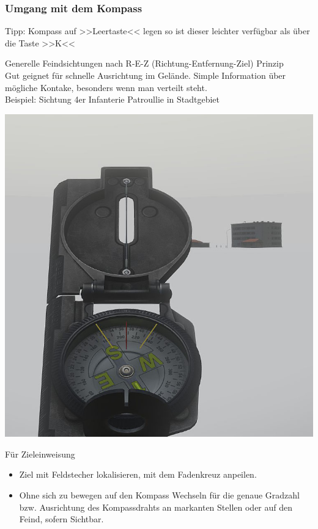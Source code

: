 \subsubsection{Umgang mit dem Kompass}

	Tipp: Kompass auf >>Leertaste<< legen so ist dieser leichter verfügbar als über die Taste >>K<<

	Generelle Feindsichtungen nach R-E-Z (Richtung-Entfernung-Ziel) Prinzip \\

	Gut geignet für schnelle Ausrichtung im Gelände. Simple Information über mögliche Kontake, besonders wenn man verteilt steht. \\


	Beispiel: Sichtung 4er Infanterie Patroullie in Stadtgebiet \\
\begin{minipage}[t]{1\textwidth}
	\includegraphics[width=\textwidth]{./Grafiken/KarteUndMarkierungen/Kompass1.jpg}
\end{minipage}

	Für Zieleinweisung
		\begin{itemize}
 			\item Ziel mit Feldstecher lokalisieren, mit dem Fadenkreuz anpeilen.
			\item Ohne sich zu bewegen auf den Kompass Wechseln für die genaue Gradzahl bzw. Ausrichtung des Kompassdrahts an markanten Stellen oder auf den Feind, sofern Sichtbar.
		\end{itemize}

